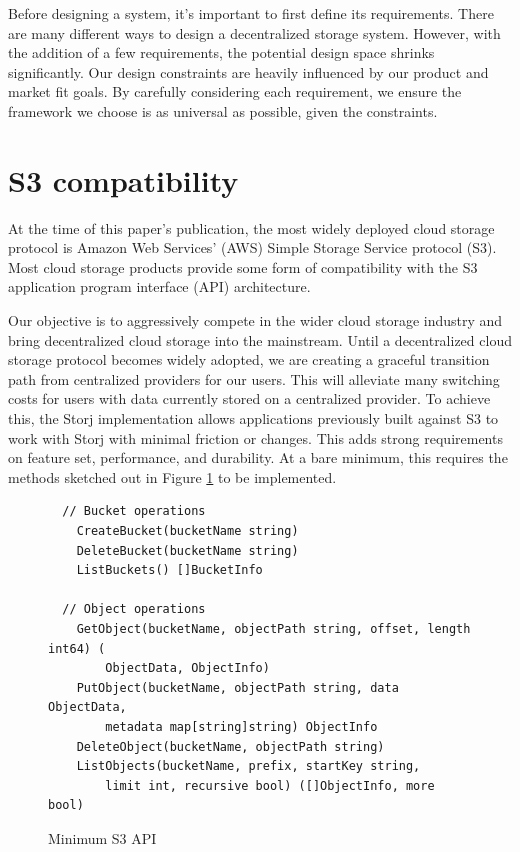 \documentclass[11pt,fleqn,openany]{book}
\begin{document}
Before designing a system, it's important to first define its requirements.
There are many different ways to design a decentralized storage system. However,
with the addition of a few requirements, the potential design space shrinks
significantly.
Our design constraints are heavily influenced by our product and
market fit goals.
By carefully considering each requirement, we ensure the framework
we choose is as universal as possible, given the constraints.

\section{S3 compatibility}

At the time of this paper's publication, the most widely deployed cloud storage
protocol is Amazon Web Services' (AWS) Simple Storage Service protocol (S3). 
Most cloud storage products provide some form of compatibility with the
S3 application program interface (API) architecture.

Our objective is to aggressively compete in the wider cloud
storage industry and bring decentralized cloud storage into the mainstream.
Until a decentralized cloud storage protocol becomes widely adopted,
we are creating a graceful transition path from centralized
providers for our users.
This will alleviate many switching costs for users with data currently stored on
a centralized provider.
To achieve this, the Storj implementation allows
applications previously built against S3 to work with Storj with
minimal friction or changes.
This adds strong requirements on feature set, performance, and durability.
At a bare minimum, this requires the methods sketched out in
Figure \ref{fig:s3-api-code} to be implemented.

\begin{figure}
\lstset{language=Golang}
\begin{lstlisting}
  // Bucket operations
	CreateBucket(bucketName string)
	DeleteBucket(bucketName string)
	ListBuckets() []BucketInfo

  // Object operations
	GetObject(bucketName, objectPath string, offset, length int64) (
	    ObjectData, ObjectInfo)
	PutObject(bucketName, objectPath string, data ObjectData,
	    metadata map[string]string) ObjectInfo
	DeleteObject(bucketName, objectPath string)
	ListObjects(bucketName, prefix, startKey string,
	    limit int, recursive bool) ([]ObjectInfo, more bool)
\end{lstlisting}
\caption{Minimum S3 API}
\label{fig:s3-api-code}
\end{figure}
\end{document}
